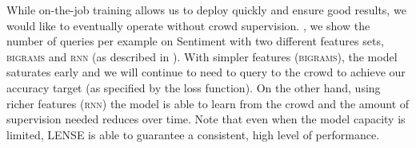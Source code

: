 


While on-the-job training allows us to deploy quickly and ensure good results, we would like to eventually operate without crowd supervision.
, we show the number of queries per example on Sentiment with two different features sets, \textsc{bigrams} and \textsc{rnn} (as described in ).
With simpler features (\textsc{bigrams}),
the model saturates early and we will continue to need to query to the crowd to achieve our accuracy target (as specified by the loss function).
On the other hand, using richer features (\textsc{rnn}) the model is able to learn from the crowd and the amount of supervision needed reduces over time.
Note that even when the model capacity is limited, LENSE is able to guarantee a consistent, high level of performance.

